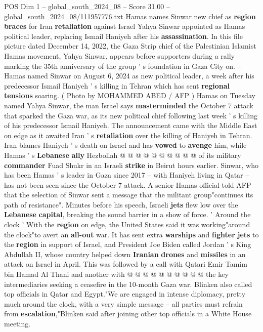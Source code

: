\begin{textsample}{POS Dim 1 – global\_south\_2024\_08 – Score 31.00 – global\_south\_2024\_08/111957776.txt}  \label{ex:f1_pos_006}
Hamas names Sinwar new chief as \textbf{region} \textbf{braces} for Iran \textbf{retaliation} against Israel Yahya Sinwar appointed as Hamas political leader, replacing Ismail Haniyeh after his \textbf{assassination}.
In this file picture dated December 14, 2022, the Gaza Strip chief of the Palestinian Islamist Hamas movement, Yahya Sinwar, appears before supporters during a rally marking the 35th anniversary of the group ' s foundation in Gaza City on. -- Hamas named Sinwar on August 6, 2024 as new political leader, a week after his predecessor Ismail Haniyeh ' s killing in Tehran which has sent \textbf{regional} \textbf{tensions} soaring. ( Photo by MOHAMMED ABED / AFP ) Hamas on Tuesday named Yahya Sinwar, the man Israel says \textbf{masterminded} the October 7 attack that sparked the Gaza war, as its new political chief following last week ' s killing of his predecessor Ismail Haniyeh.
The announcement came with the Middle East on edge as it awaited Iran ' s \textbf{retaliation} over the killing of Haniyeh in Tehran.
Iran blames Haniyeh ' s death on Israel and has \textbf{vowed} to \textbf{avenge} him, while Hamas ' s \textbf{Lebanese} \textbf{ally} Hezbollah @ @ @ @ @ @ @ @ @ @ of its military \textbf{commander} Fuad Shukr in an Israeli \textbf{strike} in Beirut hours earlier.
Sinwar, who has been Hamas ' s leader in Gaza since 2017 -- with Haniyeh living in Qatar -- has not been seen since the October 7 attack.
A senior Hamas official told AFP that the selection of Sinwar sent a message that the militant group"continues its path of resistance".
Minutes before his speech, Israeli \textbf{jets} flew low over the \textbf{Lebanese} \textbf{capital}, breaking the sound barrier in a show of force. ' Around the clock ' With the \textbf{region} on edge, the United States said it was working"around the clock"to avert an \textbf{all-out} war.
It has sent extra \textbf{warships} and \textbf{fighter} \textbf{jets} to the \textbf{region} in support of Israel, and President Joe Biden called Jordan ' s King Abdullah II, whose country helped down \textbf{Iranian} \textbf{drones} and \textbf{missiles} in an attack on Israel in April.
This was followed by a call with Qatari Emir Tamim bin Hamad Al Thani and another with @ @ @ @ @ @ @ @ @ @ the key intermediaries seeking a ceasefire in the 10-month Gaza war.
Blinken also called top officials in Qatar and Egypt."We are engaged in intense diplomacy, pretty much around the clock, with a very simple message -- all parties must refrain from \textbf{escalation},"Blinken said after joining other top officials in a White House meeting.

\end{textsample}
